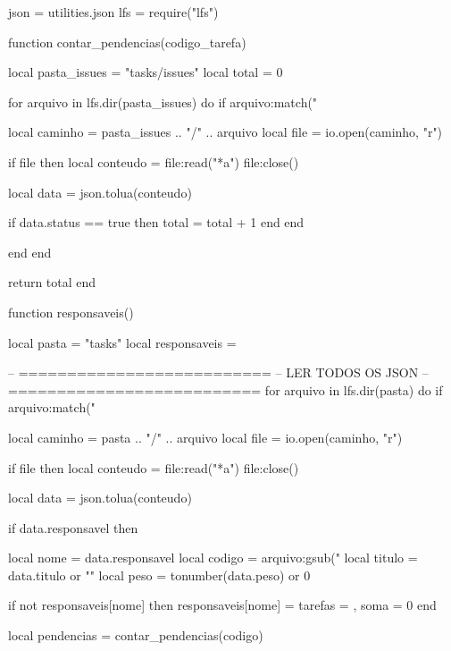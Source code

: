 \renewcommand{\arraystretch}{1.4}


\begin{luacode*}

json = utilities.json
lfs  = require("lfs")

function contar_pendencias(codigo_tarefa)

  local pasta_issues = "tasks/issues"
  local total = 0

  for arquivo in lfs.dir(pasta_issues) do
    if arquivo:match("%

      local caminho = pasta_issues .. "/" .. arquivo
      local file = io.open(caminho, "r")

      if file then
        local conteudo = file:read("*a")
        file:close()

        local data = json.tolua(conteudo)

        if data.status == true then
          total = total + 1
        end
      end

    end
  end

  return total
end

function responsaveis()

  local pasta = "tasks"
  local responsaveis = {}

  -- ==========================
  -- LER TODOS OS JSON
  -- ==========================
  for arquivo in lfs.dir(pasta) do
    if arquivo:match("%

      local caminho = pasta .. "/" .. arquivo
      local file = io.open(caminho, "r")

      if file then
        local conteudo = file:read("*a")
        file:close()

        local data = json.tolua(conteudo)

        if data.responsavel then

          local nome   = data.responsavel
          local codigo = arquivo:gsub("%
          local titulo = data.titulo or ""
          local peso   = tonumber(data.peso) or 0

          if not responsaveis[nome] then
            responsaveis[nome] = {
              tarefas = {},
              soma = 0
            }
          end

          local pendencias = contar_pendencias(codigo)


\end{luacode*}
